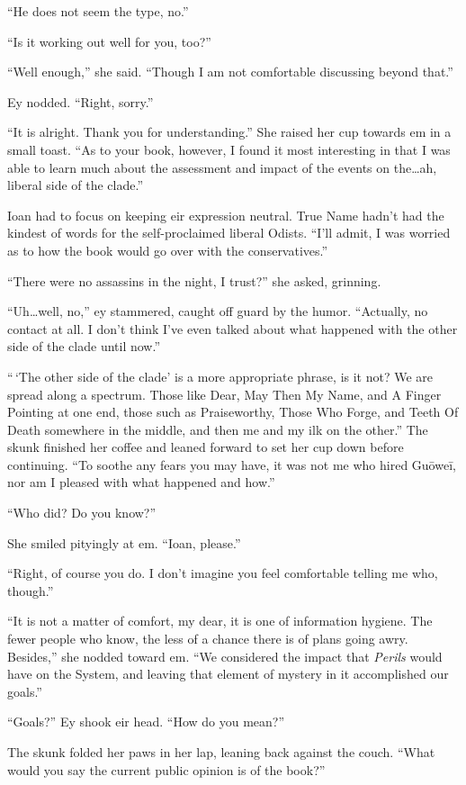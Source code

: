 ``He does not seem the type, no.''

``Is it working out well for you, too?''

``Well enough,'' she said. ``Though I am not comfortable discussing beyond that.''

Ey nodded. ``Right, sorry.''

``It is alright. Thank you for understanding.'' She raised her cup towards em in a small toast. ``As to your book, however, I found it most interesting in that I was able to learn much about the assessment and impact of the events on the\ldots ah, liberal side of the clade.''

Ioan had to focus on keeping eir expression neutral. True Name hadn't had the kindest of words for the self-proclaimed liberal Odists. ``I'll admit, I was worried as to how the book would go over with the conservatives.''

``There were no assassins in the night, I trust?'' she asked, grinning.

``Uh\ldots well, no,'' ey stammered, caught off guard by the humor. ``Actually, no contact at all. I don't think I've even talked about what happened with the other side of the clade until now.''

``\,`The other side of the clade' is a more appropriate phrase, is it not? We are spread along a spectrum. Those like Dear, May Then My Name, and A Finger Pointing at one end, those such as Praiseworthy, Those Who Forge, and Teeth Of Death somewhere in the middle, and then me and my ilk on the other.'' The skunk finished her coffee and leaned forward to set her cup down before continuing. ``To soothe any fears you may have, it was not me who hired Guōweī, nor am I pleased with what happened and how.''

``Who did? Do you know?''

She smiled pityingly at em. ``Ioan, please.''

``Right, of course you do. I don't imagine you feel comfortable telling me who, though.''

``It is not a matter of comfort, my dear, it is one of information hygiene. The fewer people who know, the less of a chance there is of plans going awry. Besides,'' she nodded toward em. ``We considered the impact that \emph{Perils} would have on the System, and leaving that element of mystery in it accomplished our goals.''

``Goals?'' Ey shook eir head. ``How do you mean?''

The skunk folded her paws in her lap, leaning back against the couch. ``What would you say the current public opinion is of the book?''

